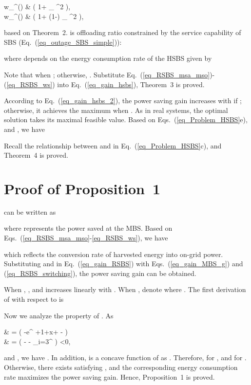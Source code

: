 \documentclass[12pt, draftclsnofoot,onecolumn]{IEEEtran}
\begin{document}
    w_^{()} & \geq {} \left( 1+ \rho_ ^2 \right), \\
    w_^{()} & \geq {} \left( 1+ (1-\varphi) \rho_ ^2 \right),
    
based on Theorem~2.
 is offloading ratio constrained by the service capability of SBS (Eq.~(\ref{eq_outage_SBS_simple})):

where  depends on the energy consumption rate of the HSBS  given by

Note that  when ; otherwise, .
Substitute Eq.~(\ref{eq_RSBS_msa_mso})-(\ref{eq_RSBS_ws}) into Eq.~(\ref{eq_gain_hsbs}), Theorem~3 is proved.

According to Eq.~(\ref{eq_gain_hsbs_2}), the power saving gain increases with  if ; otherwise, it achieves the maximum when .
As  in real systems, the optimal solution  takes its maximal feasible value.
Based on Eqs.~(\ref{eq_Problem_HSBS}e), and ,  we have

Recall the relationship between  and  in Eq.~(\ref{eq_Problem_HSBS}c), and Theorem~4 is proved.


\section{Proof of Proposition~1}
\label{appendix_RSBS_gain}

 can be written as

where  represents the power saved at the MBS.
Based on Eqs.~(\ref{eq_RSBS_msa_mso}-\ref{eq_RSBS_ws}), we have

which reflects the conversion rate of harvested energy into on-grid power.
Substituting  and  in Eq.~(\ref{eq_gain_RSBS}) with Eqs.~(\ref{eq_gain_MBS_g}) and (\ref{eq_RSBS_switching}), the power saving gain  can be obtained.

When , , and  increases linearly with .
When , denote  where .
The first derivation of  with respect to  is

Now we analyze the property of . As

     & =  \left( -e^ +1+x+ -   \right)\\
    & =  \left( -  - \sum\limits_{i=3}\limits^{\infty}   \right) <0,
    
and , we have .
In addition,  is a concave function of  as . Therefore,  for , and  for .
Otherwise, there exists  satisfying , and the corresponding energy consumption rate  maximizes the power saving gain. Hence, Proposition~1 is proved.  
\end{document}
